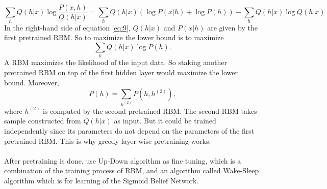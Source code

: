 \documentclass[12pt]{article}
\begin{document}
\begin{equation}\label{eq:9}
\sum_h Q(h|x)\log\frac{P(x,h)}{Q(h|x)}= \sum_h Q(h|x)(\log P(x|h) + \log P(h))-\sum_h Q(h|x)\log Q(h|x)
\end{equation}
In the right-hand side of equation \eqref{eq:9}, $Q(h|x)$ and $P(x|h)$ are given by the first pretrained RBM. So to maximize the lower bound is to maximize \begin{equation}
\sum_h Q(h|x)\log P(h).
\end{equation}
A RBM maximizes the likelihood of the input data. So staking another pretrained RBM on top of the first hidden layer would maximize the lower bound. Moreover, \begin{equation}
P(h) = \sum_{h^{(2)}}P(h, h^{(2)}), 
\end{equation}
where $h^{(2)}$ is computed by the second pretrained RBM. The second RBM takes sample constructed from $Q(h|x)$ as input. But it could be trained independently since its parameters do not depend on the parameters of the first pretrained RBM. This is why greedy layer-wise pretraining works.\\
\\
After pretraining is done, use Up-Down algorithm as fine tuning, which is a combination of the training process of RBM, and an algorithm called Wake-Sleep algorithm which is for learning of the Sigmoid Belief Network.
\end{document}
